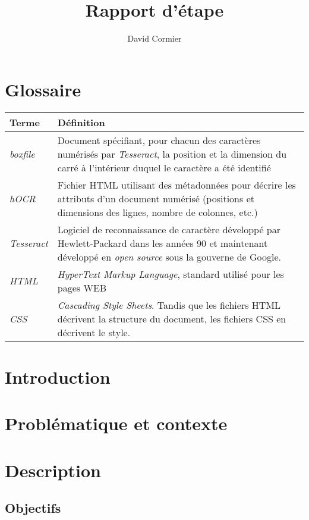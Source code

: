 \documentclass[12pt]{report}
\title{Rapport d'étape}
\author{David Cormier}
\begin{document}

\tableofcontents
\newpage
\listoffigures
\listoftables
\newpage
\onehalfspacing
\setcounter{chapter}{1}
\section{Glossaire}
\begin{tabular}{| p{3cm} | p{12cm} |}
    \rowcolor[gray]{0.9} \hline
    Terme & Définition \\ \hline
    \emph{boxfile} & Document spécifiant, pour chacun des caractères numérisés par \emph{Tesseract}, la position et la dimension du carré à l'intérieur duquel le caractère a été identifié \\ \hline
    \emph{hOCR} & Fichier HTML utilisant des métadonnées pour décrire les attributs d'un document numérisé (positions et dimensions des lignes, nombre de colonnes, etc.) \\ \hline
    \emph{Tesseract} & Logiciel de reconnaissance de caractère développé par Hewlett-Packard dans les années 90 et maintenant développé en \emph{open source} sous la gouverne de Google. \\ \hline
    \emph{HTML} & \emph{HyperText Markup Language}, standard utilisé pour les pages WEB \\ \hline
    \emph{CSS} & \emph{Cascading Style Sheets}. Tandis que les fichiers HTML décrivent la structure du document, les fichiers CSS en décrivent le style.
\end{tabular}
\newpage


\section{Introduction}


\section{Problématique et contexte}


\section{Description}


\subsection{Objectifs}

\end{document}
